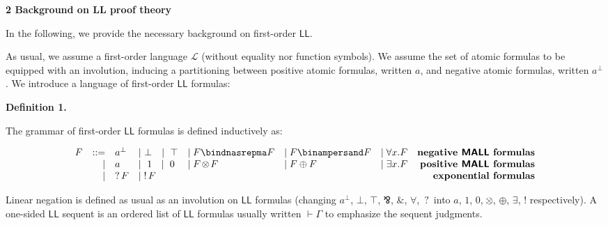  
 


 
\par\medskip\noindent\textbf{2 Background on LL proof theory}\par
 
 
In the following, we provide the necessary background on first-order $\mathsf{LL}$.\par
 
 
 
As usual, we assume a first-order language $\mathcal{L}$ (without equality nor function symbols). We assume the set of atomic formulas to be equipped with an involution, inducing a partitioning between positive atomic formulas, written $a$, and negative atomic formulas, written $a^{\perp}$. We introduce a language of first-order $\mathsf{LL}$ formulas:\par
 
 
 
\par\medskip\noindent\textbf{Definition 1.}\par
 
 
The grammar of first-order $\mathsf{LL}$ formulas is defined inductively as:\par
    \[\begin{array}[]{lrlllllr}F&::=&a^{\perp}&\mid\leavevmode\nobreak\ \perp\leavevmode\nobreak\ \leavevmode\nobreak\ \leavevmode\nobreak\ \mid\leavevmode\nobreak\ \top&\mid F\bindnasrepma F&\mid F\binampersand F&\mid\forall x.F&\textbf{negative \boldmath$\mathsf{MALL}$ formulas}\\
&\mid&a&\mid\leavevmode\nobreak\ 1\leavevmode\nobreak\ \leavevmode\nobreak\ \mid\leavevmode\nobreak\ 0&\mid F\hskip-1.0pt\otimes\hskip-1.0ptF&\mid F\oplus
F&\mid\exists x.F&\textbf{positive \boldmath$\mathsf{MALL}$ formulas}\\
&\mid&\mathop{?}F&\mid\mathop{!}F&&&&\textbf{exponential formulas}\end{array}\]    
 
 
Linear negation is defined as usual as an involution on $\mathsf{LL}$ formulas (changing $a^{\perp}$, $\bot$, $\top$, $\bindnasrepma$, $\binampersand$, $\forall$, $\mathop{?}$ into $a$, $1$, $0$, $\hskip-1.0pt\otimes\hskip-1.0pt$, $\oplus$, $\exists$, $\mathop{!}$ respectively). A one-sided $\mathsf{LL}$ sequent is an ordered list of $\mathsf{LL}$ formulas usually written $\vdash\Gamma$ to emphasize the sequent judgments.\par
 

